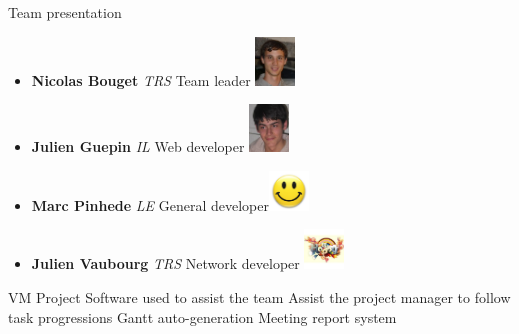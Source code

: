 \documentclass[12pt]{beamer}
\begin{document}
\begin{frame}{Team presentation}
    \begin{itemize}
	\item {\bf Nicolas Bouget} \emph{TRS} Team leader \hfill \includegraphics[width=30pt]{img/bouget.jpg}\\
	\vfill
	\item {\bf Julien Guepin} \emph{IL} Web developer \hfill \includegraphics[width=30pt]{img/guepin.jpg}
	\vfill
	\item {\bf Marc Pinhede} \emph{LE} General developer\hfill \includegraphics[width=30pt]{img/pinhede.jpg}
	\vfill
	\item {\bf Julien Vaubourg} \emph{TRS} Network developer \hfill \includegraphics[width=30pt]{img/vaubourg.jpg}
    \end{itemize}
\end{frame}


\begin{frame}{VM Project}
    Software used to assist the team
    \vfill
    Assist the project manager to follow task progressions
    \vfill
    Gantt auto-generation
    \vfill
    Meeting report system
\end{frame}
\end{document}
